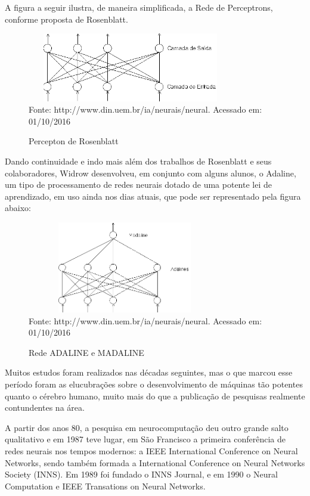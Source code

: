 A figura a seguir ilustra, de maneira simplificada, a Rede de Perceptrons, conforme proposta de Rosenblatt.

\begin{figure}[!ht]
\centering
\caption{Percepton de Rosenblatt}
\vspace{1mm}
\includegraphics[width=90mm, height=30mm]{Figuras/Neural/Rosenblatt.png}\\
\tiny Fonte: http://www.din.uem.br/ia/neurais/neural. Acessado em: 01/10/2016
\end{figure}


Dando continuidade e indo mais além dos trabalhos de Rosenblatt e seus colaboradores, Widrow desenvolveu, em conjunto com alguns 
alunos, o Adaline, um tipo de processamento de redes neurais dotado de uma potente lei de aprendizado, em uso ainda nos dias atuais, 
que pode ser representado pela figura abaixo:

\begin{figure}[!ht]
\centering
\caption{Rede ADALINE e MADALINE}
\vspace{1mm}
\includegraphics[width=85mm, height=40mm]{Figuras/Neural/Adaline.png}\\
\tiny Fonte: http://www.din.uem.br/ia/neurais/neural. Acessado em: 01/10/2016
\end{figure}

\pagebreak

Muitos estudos foram realizados nas décadas seguintes, mas o que marcou esse período foram as elucubrações sobre o 
desenvolvimento de máquinas tão potentes quanto o cérebro humano, muito mais do que a publicação de pesquisas realmente 
contundentes na área.

A partir dos anos 80, a pesquisa em neurocomputação deu outro grande salto qualitativo e em 1987 teve lugar, em São Francisco a 
primeira conferência de redes neurais nos tempos modernos: a IEEE International Conference on Neural Networks, sendo também formada 
a International Conference on Neural Networks Society (INNS). 
Em 1989 foi fundado o INNS Journal, e em 1990 o Neural Computation e IEEE Transations on Neural Networks.

